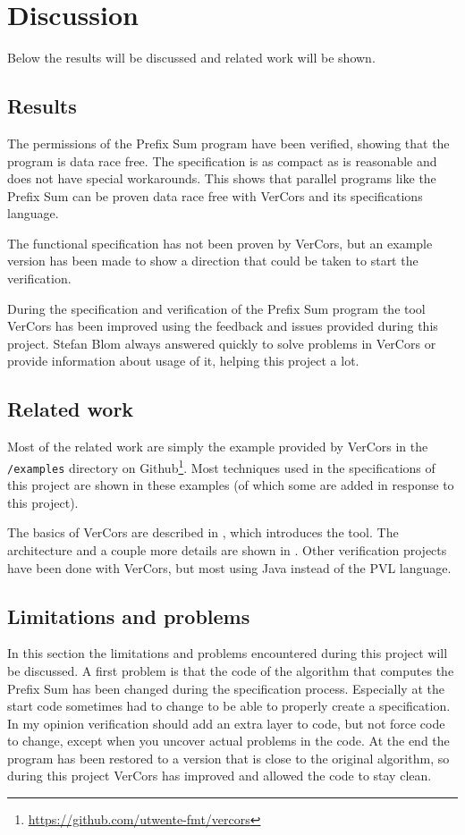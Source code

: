 \documentclass[a4paper]{article}
\newcommand{\code}[1]{\texttt{\small \color{inline}#1}} %
\begin{document}
\section{Discussion}
Below the results will be discussed and related work will be shown.

\subsection{Results}
The permissions of the Prefix Sum program have been verified, showing that the program is data race free. The specification is as compact as is reasonable and does not have special workarounds. This shows that parallel programs like the Prefix Sum can be proven data race free with VerCors and its specifications language.

The functional specification has not been proven by VerCors, but an example version has been made to show a direction that could be taken to start the verification.

During the specification and verification of the Prefix Sum program the tool VerCors has been improved using the feedback and issues provided during this project. Stefan Blom always answered quickly to solve problems in VerCors or provide information about usage of it, helping this project a lot.

\subsection{Related work}
Most of the related work are simply the example provided by VerCors in the \code{/examples} directory on Github\footnote{\url{https://github.com/utwente-fmt/vercors}}. Most techniques used in the specifications of this project are shown in these examples (of which some are added in response to this project).

The basics of VerCors are described in \cite{blom2014vercors}, which introduces the tool. The architecture and a couple more details are shown in \cite{amighi2012vercors}. Other verification projects have been done with VerCors, but most using Java instead of the PVL language.

\subsection{Limitations and problems}
In this section the limitations and problems encountered during this project will be discussed. A first problem is that the code of the algorithm that computes the Prefix Sum has been changed during the specification process. Especially at the start code sometimes had to change to be able to properly create a specification. In my opinion verification should add an extra layer to code, but not force code to change, except when you uncover actual problems in the code. At the end the program has been restored to a version that is close to the original algorithm, so during this project VerCors has improved and allowed the code to stay clean.
\end{document}
